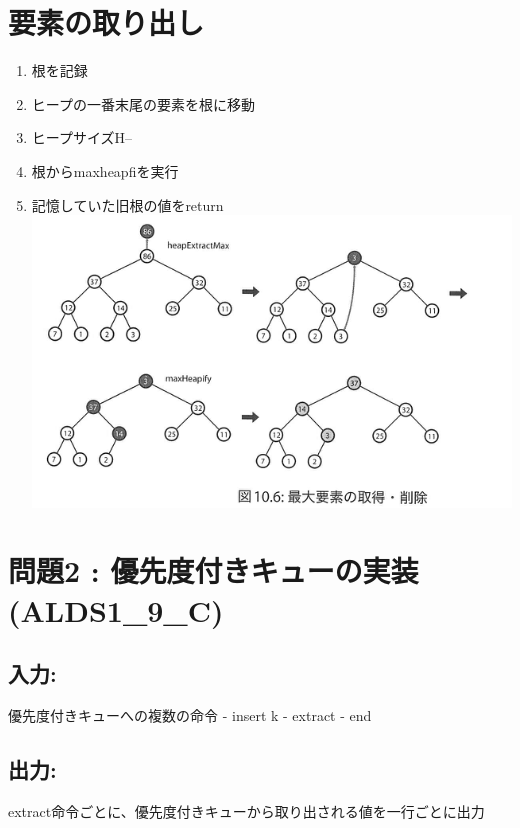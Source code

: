 \documentclass[11pt]{article}
\makeatletter
\def\maxwidth{\ifdim\Gin@nat@width>\linewidth\linewidth
    \else\Gin@nat@width\fi}
\let\Oldincludegraphics\includegraphics
\renewcommand{\includegraphics}[1]{\Oldincludegraphics[width=.8\maxwidth]{#1}}
\providecommand{\tightlist}{%
      \setlength{\itemsep}{0pt}\setlength{\parskip}{0pt}}
\makeatother
\begin{document}
    \section{要素の取り出し}\label{ux8981ux7d20ux306eux53d6ux308aux51faux3057}

\begin{enumerate}
\def\labelenumi{\arabic{enumi}.}
\tightlist
\item
  根を記録
\item
  ヒープの一番末尾の要素を根に移動
\item
  ヒープサイズH--
\item
  根からmaxheapfiを実行
\item
  記憶していた旧根の値をreturn \includegraphics{imgs/popPQ.png}
\end{enumerate}

    \section{問題2 :
優先度付きキューの実装(ALDS1\_9\_C)}\label{ux554fux984c2-ux512aux5148ux5ea6ux4ed8ux304dux30adux30e5ux30fcux306eux5b9fux88c5alds1_9_c}

\subsection{入力:}\label{ux5165ux529b}

優先度付きキューへの複数の命令 - insert k - extract - end

\subsection{出力:}\label{ux51faux529b}

extract命令ごとに、優先度付きキューから取り出される値を一行ごとに出力
\end{document}
